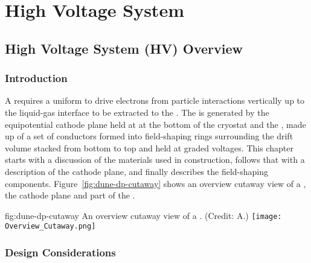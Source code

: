 \chapter{High Voltage System}
\label{ch:fddp-hv}

\section{High Voltage System (HV) Overview}
\label{sec:fddp-hv-ov}


\subsection{Introduction}
\label{sec:fddp-hv-intro}

A  %
requires a uniform \efield %
to drive electrons from particle interactions vertically up to the liquid-gas interface to be extracted to the . %
The \efield is generated by the equipotential cathode plane held at \hv at the bottom of the cryostat and the , made up of a set of %
conductors formed into field-shaping rings surrounding the drift volume stacked from bottom to top %
and held at graded voltages. 
This chapter starts with a discussion of the materials used in construction, follows that with a description of the cathode plane, and finally describes the field-shaping components. 
Figure~\ref{fig:dune-dp-cutaway} shows an overview cutaway view of a , the cathode plane and %
part of the \fcage.


\begin{dunefigure}{fig:dune-dp-cutaway}
{An overview cutaway view of a \dpmod. (Credit: A.)}
\texttt{[image: Overview\_Cutaway.png]}
\end{dunefigure}
\subsection{Design Considerations}
\label{sec:fddp-hv-des-consid}

